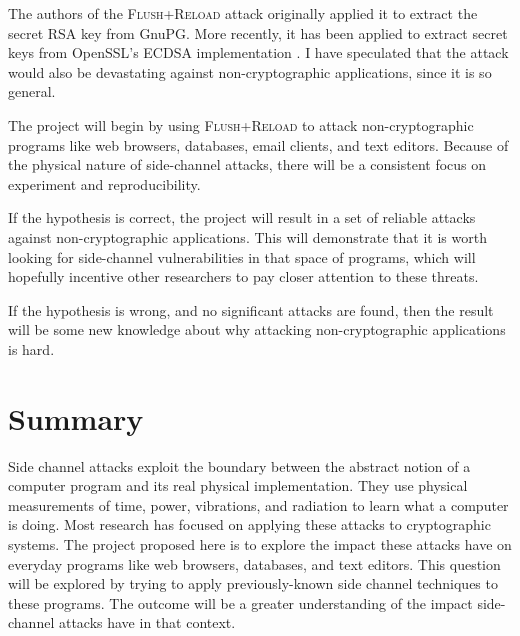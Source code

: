 \documentclass{acm_proc_article-sp}
\begin{document}
The authors of the \textsc{Flush+Reload} attack originally applied it to extract
the secret RSA key from GnuPG. More recently, it has been applied to extract
secret keys from OpenSSL's ECDSA implementation \cite{yarom2014recovering}.
I have speculated \cite{hornby2013flush} that the attack would also be
devastating against non-cryptographic applications, since it is so general.

The project will begin by using \textsc{Flush+Reload} to attack
non-cryptographic programs like web browsers, databases, email clients, and text
editors. Because of the physical nature of side-channel attacks, there will be
a consistent focus on experiment and reproducibility.

If the hypothesis is correct, the project will result in a set of reliable
attacks against non-cryptographic applications. This will demonstrate that it is
worth looking for side-channel vulnerabilities in that space of programs, which
will hopefully incentive other researchers to pay closer attention to these
threats.

If the hypothesis is wrong, and no significant attacks are found, then the
result will be some new knowledge about why attacking non-cryptographic
applications is hard.

\section{Summary}
\label{sec:conclusion}

Side channel attacks exploit the boundary between the abstract notion of
a computer program and its real physical implementation. They use physical
measurements of time, power, vibrations, and radiation to learn what a computer
is doing. Most research has focused on applying these attacks to cryptographic
systems. The project proposed here is to explore the impact these attacks have
on everyday programs like web browsers, databases, and text editors. This
question will be explored by trying to apply previously-known side channel
techniques to these programs. The outcome will be a greater understanding of the
impact side-channel attacks have in that context.



\end{document}
